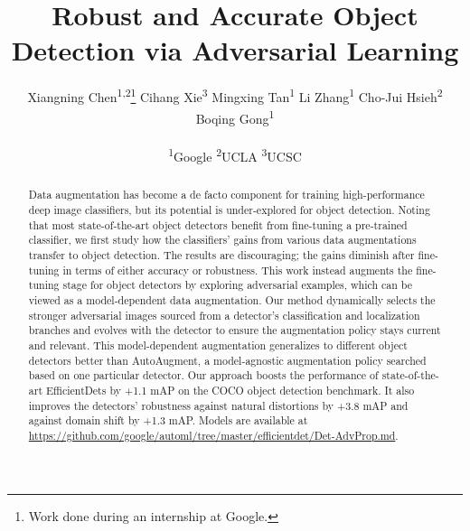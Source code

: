 \documentclass[final]{cvpr}
\begin{document}
\title{Robust and Accurate Object Detection via Adversarial Learning 
}

\author{
Xiangning Chen\textsuperscript{1,2}\thanks{Work done during an internship at Google.}
\enskip Cihang Xie\textsuperscript{3}
\enskip Mingxing Tan\textsuperscript{1}
\enskip Li Zhang\textsuperscript{1}
\enskip Cho-Jui Hsieh\textsuperscript{2}
\enskip Boqing Gong\textsuperscript{1}\\ \vspace{-0.3em}
\\
\textsuperscript{1}Google \enskip\enskip\enskip\enskip\enskip\enskip \textsuperscript{2}UCLA \enskip\enskip\enskip\enskip\enskip\enskip \textsuperscript{3}UCSC\\
}

\maketitle


\begin{abstract}















Data augmentation has become a de facto component for training high-performance deep image classifiers, but its potential is under-explored for object detection. Noting that most state-of-the-art object detectors benefit from fine-tuning a pre-trained classifier, we first study how the classifiers' gains from various data augmentations transfer to object detection. The results are discouraging; the gains diminish after fine-tuning in terms of either accuracy or robustness. This work instead augments the fine-tuning stage for object detectors by exploring adversarial examples, which can be viewed as a model-dependent data augmentation. Our method dynamically selects the stronger adversarial images sourced from a detector's classification and localization branches and evolves with the detector to ensure the augmentation policy stays current and relevant. This model-dependent augmentation generalizes to different object detectors better than AutoAugment, a model-agnostic augmentation policy searched based on one particular detector. Our approach boosts the performance of state-of-the-art EfficientDets by +1.1 mAP on the COCO object detection benchmark. It also improves the detectors' robustness against natural distortions by +3.8 mAP and against domain shift by +1.3 mAP. Models are available at \url{https://github.com/google/automl/tree/master/efficientdet/Det-AdvProp.md}.










\end{abstract}
\end{document}
